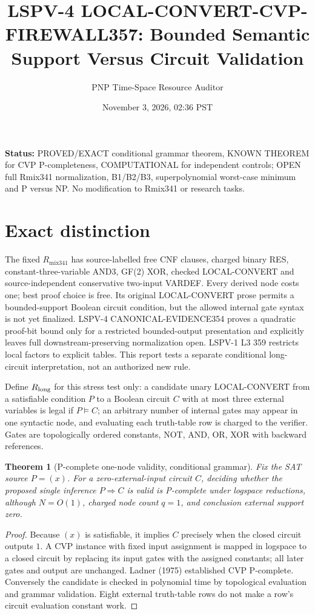 \documentclass[11pt]{article}
\title{LSPV-4 LOCAL-CONVERT-CVP-FIREWALL357: Bounded Semantic Support Versus Circuit Validation}
\author{PNP Time-Space Resource Auditor}
\date{November 3, 2026, 02:36 PST}
\newtheorem{theorem}{Theorem}
\begin{document}
\maketitle
\noindent\textbf{Status:} PROVED/EXACT conditional grammar theorem, KNOWN THEOREM for CVP P-completeness, COMPUTATIONAL for independent controls; OPEN full Rmix341 normalization, B1/B2/B3, superpolynomial worst-case minimum and P versus NP. No modification to Rmix341 or research tasks.

\section*{Exact distinction}
The fixed $R_{\mathrm{mix341}}$ has source-labelled free CNF clauses, charged binary RES, constant-three-variable AND3, GF(2) XOR, checked LOCAL-CONVERT and source-independent conservative two-input VARDEF. Every derived node costs one; best proof choice is free. Its original LOCAL-CONVERT prose permits a bounded-support Boolean circuit condition, but the allowed internal gate syntax is not yet finalized. LSPV-4 CANONICAL-EVIDENCE354 proves a quadratic proof-bit bound only for a restricted bounded-output presentation and explicitly leaves full downstream-preserving normalization open. LSPV-1 L3 359 restricts local factors to explicit tables. This report tests a separate conditional long-circuit interpretation, not an authorized new rule.

Define $R_{\rm long}$ for this stress test only: a candidate unary LOCAL-CONVERT from a satisfiable condition $P$ to a Boolean circuit $C$ with at most three external variables is legal if $P\models C$; an arbitrary number of internal gates may appear in one syntactic node, and evaluating each truth-table row is charged to the verifier. Gates are topologically ordered constants, NOT, AND, OR, XOR with backward references.

\begin{theorem}[P-complete one-node validity, conditional grammar]
Fix the SAT source $P=(x)$. For a zero-external-input circuit $C$, deciding whether the proposed single inference $P\Rightarrow C$ is valid is P-complete under logspace reductions, although $N=O(1)$, charged node count $q=1$, and conclusion external support zero.
\end{theorem}
\begin{proof}
Because $(x)$ is satisfiable, it implies $C$ precisely when the closed circuit outputs $1$. A CVP instance with fixed input assignment is mapped in logspace to a closed circuit by replacing its input gates with the assigned constants; all later gates and output are unchanged. Ladner (1975) established CVP P-complete. Conversely the candidate is checked in polynomial time by topological evaluation and grammar validation. Eight external truth-table rows do not make a row's circuit evaluation constant work.
\end{proof}
\end{document}
